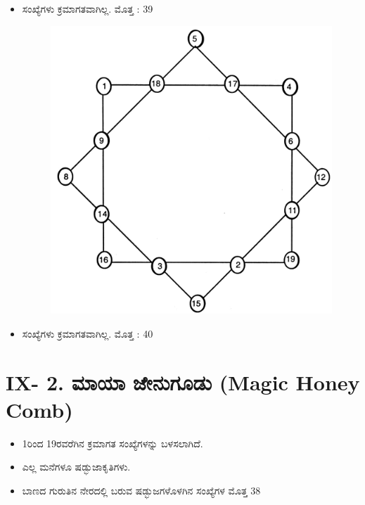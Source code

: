 \newpage

\begin{itemize}
	\item ಸಂಖ್ಯೆಗಳು ಕ್ರಮಾಗತವಾಗಿಲ್ಲ. ಮೊತ್ತ : 39
	\begin{figure}[H]
	\includegraphics[scale=0.85]{src/figures/chap8/fig8.7.jpg}
	\end{figure}
	\item ಸಂಖ್ಯೆಗಳು ಕ್ರಮಾಗತವಾಗಿಲ್ಲ. ಮೊತ್ತ : 40
\end{itemize}

\section*{IX- 2. ಮಾಯಾ ಜೇನುಗೂಡು (Magic Honey Comb)}
\begin{itemize}
	\item 1ರಿಂದ 19ರವರೆಗಿನ ಕ್ರಮಾಗತ ಸಂಖ್ಯೆಗಳನ್ನು ಬಳಸಲಾಗಿದೆ.
	\item ಎಲ್ಲ ಮನೆಗಳೂ ಷಡ್ಭುಜಾಕೃತಿಗಳು.
	\item ಬಾಣದ ಗುರುತಿನ ನೇರದಲ್ಲಿ ಬರುವ ಷಡ್ಭುಜಗಳೊಳಗಿನ ಸಂಖ್ಯೆಗಳ ಮೊತ್ತ $\boxed{38}$
\end{itemize}

\newpage

